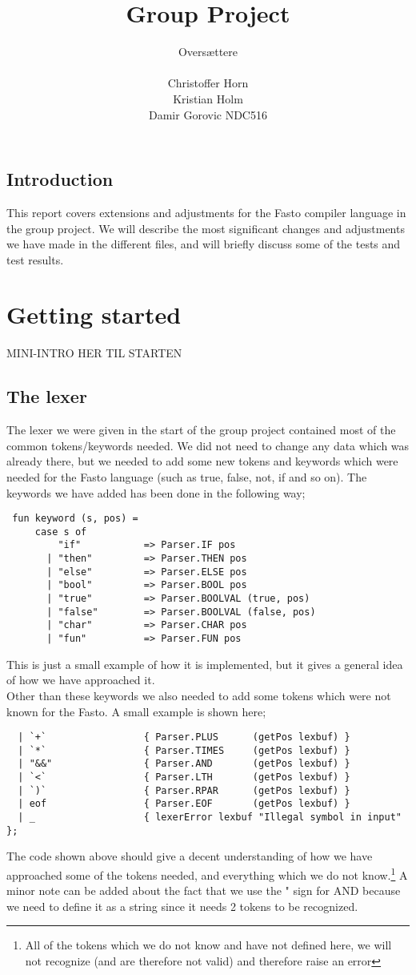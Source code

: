 \documentclass[12pt]{article}
\author{Oversættere\\\\Christoffer Horn\\Kristian Holm\\Damir Gorovic NDC516}
\title{Group Project}
\begin{document}
\maketitle
\hfil \break
\hfil \break
\hfil \break
\subsection*{Introduction}
This report covers extensions and adjustments for the Fasto compiler language in the group project. We will describe the most significant changes and adjustments we have made in the different files, and will briefly discuss some of the tests and test results.
\pagebreak
\tableofcontents
\pagebreak
\section{Getting started}
MINI-INTRO HER TIL STARTEN
\subsection{The lexer}
The lexer we were given in the start of the group project contained most of the common tokens/keywords needed. We did not need to change any data which was already there, but we needed to add some new tokens and keywords which were needed for the Fasto language (such as true, false, not, if and so on). The keywords we have added has been done in the following way;\\
\begin{verbatim}
 fun keyword (s, pos) =
     case s of
         "if"           => Parser.IF pos
       | "then"         => Parser.THEN pos
       | "else"         => Parser.ELSE pos
       | "bool"         => Parser.BOOL pos
       | "true"         => Parser.BOOLVAL (true, pos)
       | "false"        => Parser.BOOLVAL (false, pos)
       | "char"         => Parser.CHAR pos
       | "fun"          => Parser.FUN pos
\end{verbatim}
This is just a small example of how it is implemented, but it gives a general idea of how we have approached it. \\
Other than these keywords we also needed to add some tokens which were not known for the Fasto. A small example is shown here;
\begin{verbatim}
  | `+`                 { Parser.PLUS      (getPos lexbuf) }
  | `*`                 { Parser.TIMES     (getPos lexbuf) }
  | "&&"                { Parser.AND       (getPos lexbuf) }
  | `<`                 { Parser.LTH       (getPos lexbuf) }
  | `)`                 { Parser.RPAR      (getPos lexbuf) }
  | eof                 { Parser.EOF       (getPos lexbuf) }
  | _                   { lexerError lexbuf "Illegal symbol in input" };
\end{verbatim}
The code shown above should give a decent understanding of how we have approached some of the tokens needed, and everything which we do not know.\footnote{All of the tokens which we do not know and have not defined here, we will not recognize (and are therefore not valid) and therefore raise an error} A minor note can be added about the fact that we use the " sign for AND because we need to define it as a string since it needs 2 tokens to be recognized.
\end{document}
